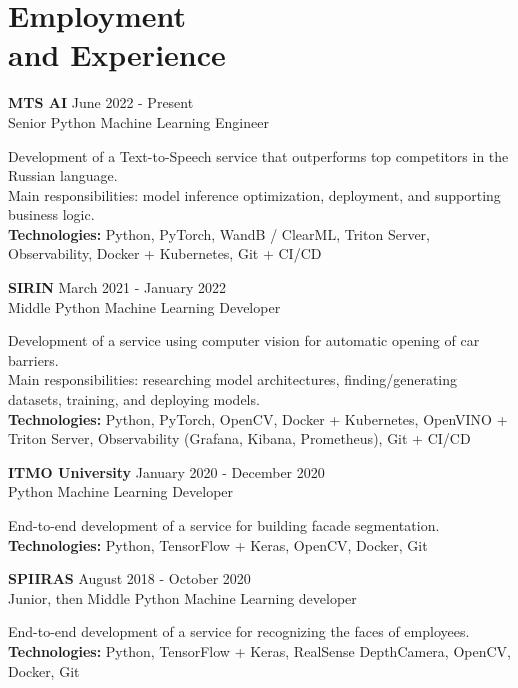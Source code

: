 \section{\sc Employment \\and Experience}
\vspace{2.6pt}

\textbf{MTS AI} \hfill June 2022 - Present \\
Senior Python Machine Learning Engineer

Development of a Text-to-Speech service that outperforms top competitors in the Russian language. \\
Main responsibilities: model inference optimization, deployment, and supporting business logic. \\
\textbf{Technologies:} Python, PyTorch, WandB / ClearML, Triton Server, Observability, Docker + Kubernetes, Git + CI/CD

\textbf{SIRIN} \hfill March 2021 - January 2022 \\
Middle Python Machine Learning Developer

Development of a service using computer vision for automatic opening of car barriers. \\
Main responsibilities: researching model architectures, finding/generating datasets, training, and deploying models. \\
\textbf{Technologies:} Python, PyTorch, OpenCV, Docker + Kubernetes, OpenVINO + Triton Server, Observability (Grafana, Kibana, Prometheus), Git + CI/CD

\textbf{ITMO University} \hfill January 2020 - December 2020 \\
Python Machine Learning Developer

End-to-end development of a service for building facade segmentation. \\
\textbf{Technologies:} Python, TensorFlow + Keras, OpenCV, Docker, Git

\textbf{SPIIRAS} \hfill August 2018 - October 2020 \\
Junior, then Middle Python Machine Learning developer

End-to-end development of a service for recognizing the faces of employees. \\
\textbf{Technologies:} Python, TensorFlow + Keras, RealSense DepthCamera, OpenCV, Docker, Git

\endinput
